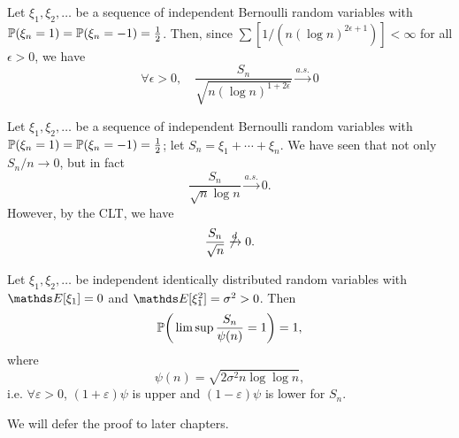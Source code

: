 \begin{example}
Let $\xi_1, \xi_2, \dots$ be a sequence of independent Bernoulli random variables with $\mathbb{P}(\xi_n = 1) = \mathbb{P}(\xi_n = -1) = \frac12$. Then, since $\sum [1/(n (\log n)^{2\epsilon + 1})] < \infty$ for all $\epsilon > 0$, we have
\begin{equation*}
    \forall \epsilon > 0, \quad \frac{S_n}{\sqrt{n (\log n)^{1+2\epsilon}}} \xrightarrow{a.s.} 0
\end{equation*}
\end{example}

Let $\xi_1, \xi_2, \dots$ be a sequence of independent Bernoulli random variables with $\mathbb{P}(\xi_n = 1) = \mathbb{P}(\xi_n = -1) = \frac12$; let $S_n = \xi_1 + \cdots + \xi_n$. We have seen that not only $S_n/n \to 0$, but in fact
\begin{equation*}
    \frac{S_n}{\sqrt{n}\log n} \xrightarrow{a.s.} 0.
\end{equation*}
However, by the CLT, we have
\begin{equation*}
    \frac{S_n}{\sqrt{n}} \not\xrightarrow{d} 0.
\end{equation*}

\begin{theorem}
Let $\xi_1, \xi_2, \dots$ be independent identically distributed random variables with $\E[\xi_1] = 0$ and $\E[\xi_1^2] = \sigma^2 > 0$. Then 
\begin{equation*}
    \mathbb{P} \bigg(\limsup \frac{S_n}{\psi(n)} = 1\bigg) = 1,
\end{equation*}
where 
\begin{equation*}
    \psi(n) = \sqrt{2 \sigma^2 n \log \log n},
\end{equation*}
i.e. $\forall \varepsilon > 0$, $(1 + \varepsilon) \psi$ is upper and $(1 - \varepsilon) \psi$ is lower for $S_n$.
\end{theorem}

We will defer the proof to later chapters.

